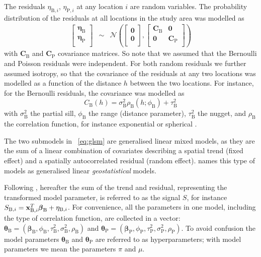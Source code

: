 \documentclass[review]{elsarticle}
\begin{document}
The residuals $\eta_{\mathrm{B},i}$, $\eta_{\mathrm{P},i}$ at any location $i$ are random variables. The probability distribution of the residuals at all locations in the study area was modelled as
\begin{eqnarray}
\left[
\begin{array}{c}
\boldsymbol{\eta}_{\mathrm{B}} \\
\boldsymbol{\eta}_{\mathrm{P}} \\
\end{array}
\right]&\sim& \mathcal{N}\left(
\left[
\begin{array}{c}
\mathbf{0} \\
\mathbf{0} \\
\end{array}
\right],
\left[
\begin{array}{cc}
\mathbf{C}_{\mathrm{B}} & \mathbf{0} \\
\mathbf{0} & \mathbf{C}_{\mathrm{P}} \\
\end{array}
\right]
\right)
\end{eqnarray}
with $\mathbf{C}_{\mathrm{B}}$ and $\mathbf{C}_{\mathrm{P}}$ covariance matrices. So note that we assumed that the Bernoulli and Poisson residuals were independent. For both random residuals we further assumed isotropy, so that the covariance of the residuals at any two locations was modelled as a function of the distance $h$ between the two locations. For instance, for the Bernoulli residuals, the covariance was modelled as
\begin{equation}
    C_{\mathrm{B}}(h)=\sigma_{\mathrm{B}}^{2}\rho_{\mathrm{B}}(h; \phi_{\mathrm{B}})+\tau_{\mathrm{B}}^{2} \label{Ch}
\end{equation}
with $\sigma_{\mathrm{B}}^{2}$ the partial sill, $\phi_{\mathrm{B}}$ the range (distance parameter), $\tau_{\mathrm{B}}^{2}$ the nugget, and $\rho_{\mathrm{B}}$ the correlation function, for instance exponential or spherical \citep{webster2007}.

The two submodels in ~\ref{eq:glsm} are generalised linear mixed models, as they are the sum of a linear combination of covariates describing a spatial trend (fixed effect) and a spatially autocorrelated residual (random effect). \citet{diggle2007} names this type of models as generalised linear \textit{geostatistical} models.

Following \citet{diggle2007}, hereafter the sum of the trend and residual, representing the transformed model parameter, is referred to as the signal $S$, for instance $S_{\mathrm{B},i}= \mathbf{x}_{\mathrm{B},i}^{T}\boldsymbol{\beta}_{\rm{B}} + \eta_{\mathrm{B},i}$. For convenience, all the parameters in one model, including the type of correlation function, are collected in  a vector: $\boldsymbol{\theta}_{\mathrm{B}}=(\boldsymbol{\beta}_{\mathrm{B}}, \phi_{\mathrm{B}}, \tau_{\mathrm{B}}^2, \sigma_{\mathrm{B}}^2, \rho_{\mathrm{B}})$ and $\boldsymbol{\theta}_{\mathrm{P}}=(\boldsymbol{\beta}_{\mathrm{P}}, \phi_{\mathrm{P}}, \tau_{\mathrm{P}}^2, \sigma_{\mathrm{P}}^2, \rho_{\mathrm{P}})$. To avoid confusion the model parameters $\boldsymbol{\theta}_{\mathrm{B}}$ and $\boldsymbol{\theta}_{\mathrm{P}}$ are referred to as hyperparameters; with model parameters we mean the parameters $\pi$ and $\mu$.
\end{document}
